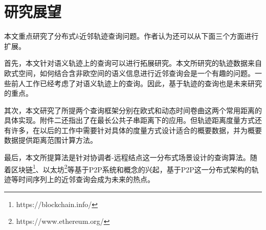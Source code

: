 \section{研究展望}
本文重点研究了分布式$k$近邻轨迹查询问题。作者认为还可以从下面三个方面进行扩展。

首先，本文针对语义轨迹上的查询可以进行拓展研究。本文所研究的轨迹数据来自欧式空间，如何结合含非欧空间的语义信息进行近邻查询会是一个有趣的问题。一些前人工作\cite{Xiao,Kaiser,WangBCSSQ17}已经考虑了对语义轨迹上的查询。因此，基于轨迹的查询也是未来研究的重点。
	
其次，本文研究了所提两个查询框架分别在欧式和动态时间卷曲这两个常用距离的具体实现。附件二还指出了在最长公共子串距离下的应用。但轨迹距离度量方式还有许多，在以后的工作中需要针对具体的度量方式设计适合的概要数据，并为概要数据提供距离范围计算方法。

	
最后，本文所提算法是针对协调者-远程结点这一分布式场景设计的查询算法。随着区块链\footnote{https://blockchain.info/}、以太坊\footnote{https://www.ethereum.org/}等基于P2P系统和概念的兴起，基于P2P这一分布式架构的轨迹等时间序列上的近邻查询会成为未来的热点。
\clearpage
\phantom{s}
\clearpage